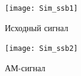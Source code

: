 \documentclass[10pt,a4paper]{article}
\begin{document}
\begin{figure}[h]\centering
	\texttt{[image: Sim\_ssb1]}
	\caption{Исходный сигнал}\label{fig.Sim_ssb1}
\end{figure}                                                                                                                                                                                                                                                                                                                                                                                                                                                                                                                                                                                                                                                                                                                                                                                                                                                                                                                                                                                                                                                                                                                                                                                                                                                                                                                                                                                                                                                                        

\begin{figure}[h]\centering
	\texttt{[image: Sim\_ssb2]}
	\caption{АМ-сигнал}\label{fig.Sim_ssb2}
\end{figure}                                                                                                                                                                                                                                                                                                                                                                                                                                                                                                                                                                                                                                                                                                                                                                                                                                                                                                                                                                                                                                                                                                                                                                                                                                                                                                                                                                                                                                                                        
\end{document}
